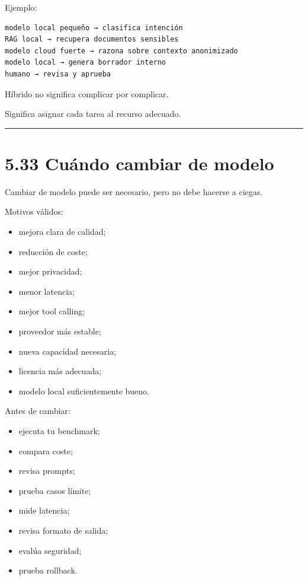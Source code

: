 Ejemplo:

\begin{lstlisting}
modelo local pequeño → clasifica intención
RAG local → recupera documentos sensibles
modelo cloud fuerte → razona sobre contexto anonimizado
modelo local → genera borrador interno
humano → revisa y aprueba
\end{lstlisting}

Híbrido no significa complicar por complicar.

Significa asignar cada tarea al recurso adecuado.

\begin{center}\rule{0.5\linewidth}{0.5pt}\end{center}

\section{5.33 Cuándo cambiar de
modelo}\label{cuuxe1ndo-cambiar-de-modelo}

Cambiar de modelo puede ser necesario, pero no debe hacerse a ciegas.

Motivos válidos:

\begin{itemize}
\tightlist
\item
  mejora clara de calidad;
\item
  reducción de coste;
\item
  mejor privacidad;
\item
  menor latencia;
\item
  mejor tool calling;
\item
  proveedor más estable;
\item
  nueva capacidad necesaria;
\item
  licencia más adecuada;
\item
  modelo local suficientemente bueno.
\end{itemize}

Antes de cambiar:

\begin{itemize}
\tightlist
\item
  ejecuta tu benchmark;
\item
  compara coste;
\item
  revisa prompts;
\item
  prueba casos límite;
\item
  mide latencia;
\item
  revisa formato de salida;
\item
  evalúa seguridad;
\item
  prueba rollback.
\end{itemize}

